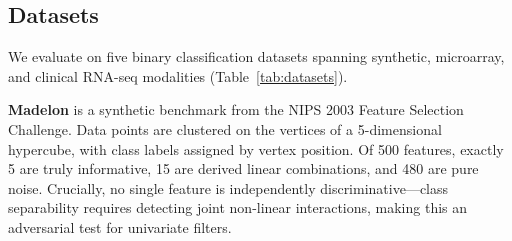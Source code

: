\documentclass[conference]{IEEEtran}
\begin{document}
\subsection{Datasets}

We evaluate on five binary classification datasets spanning synthetic, microarray, and clinical RNA-seq modalities (Table~\ref{tab:datasets}).

\begin{table}[!htb]
\centering
\caption{Dataset summary. $p/n$ = feature-to-sample ratio. RNA-seq datasets undergo zero-imputation preprocessing (genes with $>$20\% zeros removed; remainder mean-imputed). Starred values indicate post-imputation feature counts.}
\label{tab:datasets}
\end{table}

\textbf{Madelon} \cite{Guyon2003Madelon} is a synthetic benchmark from the NIPS 2003 Feature Selection Challenge. Data points are clustered on the vertices of a 5-dimensional hypercube, with class labels assigned by vertex position. Of 500 features, exactly 5 are truly informative, 15 are derived linear combinations, and 480 are pure noise. Crucially, no single feature is independently discriminative---class separability requires detecting joint non-linear interactions, making this an adversarial test for univariate filters.
\end{document}
